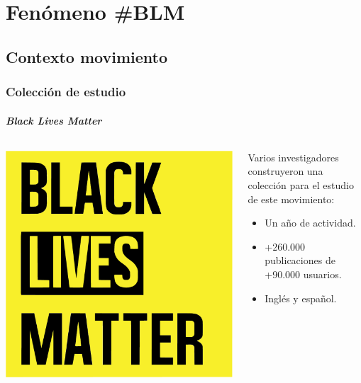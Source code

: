 \documentclass{beamer}
\begin{document}
\section{Fenómeno \#BLM}
\subsection{Contexto movimiento}
\begin{frame}
	\frametitle{Colección de estudio}
	\framesubtitle{\textit{Black Lives Matter}}
	
	\begin{columns}[T] %
		\begin{column}{0.5\textwidth}
			\includegraphics[width=\textwidth]{images/blm}
		\end{column}
		\begin{column}{0.5\textwidth}
			\pause
			Varios investigadores construyeron una colección para el estudio de este movimiento:
			\begin{itemize}
				\item Un año de actividad.
				\item +260.000 publicaciones de +90.000 usuarios.
				\item Inglés y español.
			\end{itemize}
		\end{column}
	\end{columns}
\end{frame}
\end{document}
